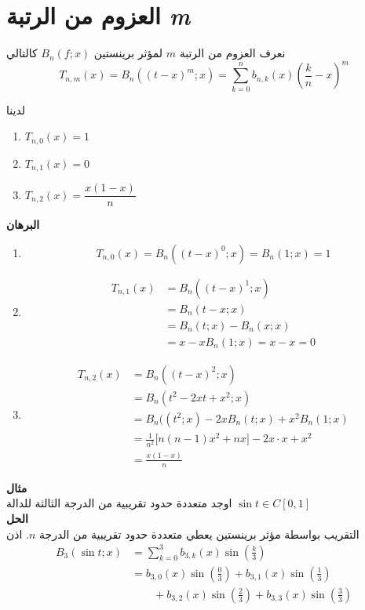 \section{العزوم من الرتبة \textit{m}}

\begin{definition}
	نعرف العزوم من الرتبة $m$ لمؤثر برينستين $B_n(f;x)$ كالتالي
	\[
	T_{n,m}(x) = B_n((t-x)^m;x) = \sum_{k=0}^{n}b_{n,k}(x) \left(\frac{k}{n}-x\right)^m
	\]
\end{definition}

\begin{theorem}
	لدينا
	\begin{english}
			\begin{enumerate}
			\item \(T_{n,0}(x)=1\)
			\item \(T_{n,1}(x)=0\)
			\item \(T_{n,2}(x)=\dfrac{x(1-x)}{n}\)
		\end{enumerate}
	\end{english}
\end{theorem}
\noindent
\textbf{البرهان}
\begin{enumerate}
	\item 
	\[
	T_{n,0}(x)  = B_n((t-x)^0;x) = B_n(1;x) = 1
	\]
	\item 
	\begin{align*}
		T_{n,1}(x) &= B_n((t-x)^1;x)\\
		&= B_n(t-x;x)\\
		&= B_n(t;x) - B_n(x;x)\\
		&= x - x B_n(1;x) = x - x = 0
	\end{align*}
	\item 
	\begin{align*}
		T_{n,2}(x) &= B_n((t-x)^2;x)\\
		&= B_n(t^2-2xt+x^2;x)\\
		&= B_n((t^2;x) - 2x B_n(t;x) + x^2B_n(1;x)\\
		&= \frac{1}{n^2}\Big[n(n-1)x^2+nx\Big] - 2x\cdot x + x^2\\
		&= \frac{x(1-x)}{n}
	\end{align*}
\end{enumerate}

\noindent
\textbf{مثال}\\
اوجد متعددة حدود تقريبية من الدرجة الثالثة للدالة $\sin t \in C[0,1]$\\
\noindent\textbf{الحل}\\
التقريب بواسطة مؤثر برينستين يعطي متعددة حدود تقريبية من الدرجة $n$. اذن
\begin{align*}
	B_3(\sin t; x) &= \sum_{k=0}^{3} b_{3,k}(x) \sin\left(\frac{k}{3}\right)\\
	&= b_{3,0}(x) \sin\left(\frac{0}{3}\right) + b_{3,1}(x) \sin\left(\frac{1}{3}\right)\\
	 &\qquad+ b_{3,2}(x) \sin\left(\frac{2}{3}\right) + b_{3,3}(x) \sin\left(\frac{3}{3}\right)
\end{align*}

